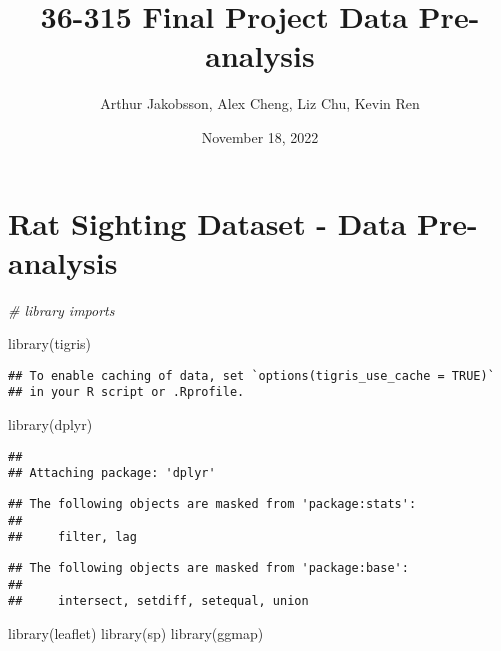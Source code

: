 \documentclass[
]{article}
\title{36-315 Final Project Data Pre-analysis}
\author{Arthur Jakobsson, Alex Cheng, Liz Chu, Kevin Ren}
\date{November 18, 2022}
\newenvironment{Shaded}{\begin{snugshade}}{\end{snugshade}}
\newcommand{\CommentTok}[1]{\textcolor[rgb]{0.56,0.35,0.01}{\textit{#1}}}
\newcommand{\FunctionTok}[1]{\textcolor[rgb]{0.00,0.00,0.00}{#1}}
\newcommand{\NormalTok}[1]{#1}
\begin{document}
\maketitle

{
\hypersetup{linkcolor=}
\setcounter{tocdepth}{2}
\tableofcontents
}
\hypertarget{rat-sighting-dataset---data-pre-analysis}{%
\section{Rat Sighting Dataset - Data
Pre-analysis}\label{rat-sighting-dataset---data-pre-analysis}}

\begin{Shaded}
\begin{Highlighting}[]
\CommentTok{\# library imports}

\FunctionTok{library}\NormalTok{(tigris)}
\end{Highlighting}
\end{Shaded}

\begin{verbatim}
## To enable caching of data, set `options(tigris_use_cache = TRUE)`
## in your R script or .Rprofile.
\end{verbatim}

\begin{Shaded}
\begin{Highlighting}[]
\FunctionTok{library}\NormalTok{(dplyr)}
\end{Highlighting}
\end{Shaded}

\begin{verbatim}
## 
## Attaching package: 'dplyr'
\end{verbatim}

\begin{verbatim}
## The following objects are masked from 'package:stats':
## 
##     filter, lag
\end{verbatim}

\begin{verbatim}
## The following objects are masked from 'package:base':
## 
##     intersect, setdiff, setequal, union
\end{verbatim}

\begin{Shaded}
\begin{Highlighting}[]
\FunctionTok{library}\NormalTok{(leaflet)}
\FunctionTok{library}\NormalTok{(sp)}
\FunctionTok{library}\NormalTok{(ggmap)}
\end{Highlighting}
\end{Shaded}
\end{document}
